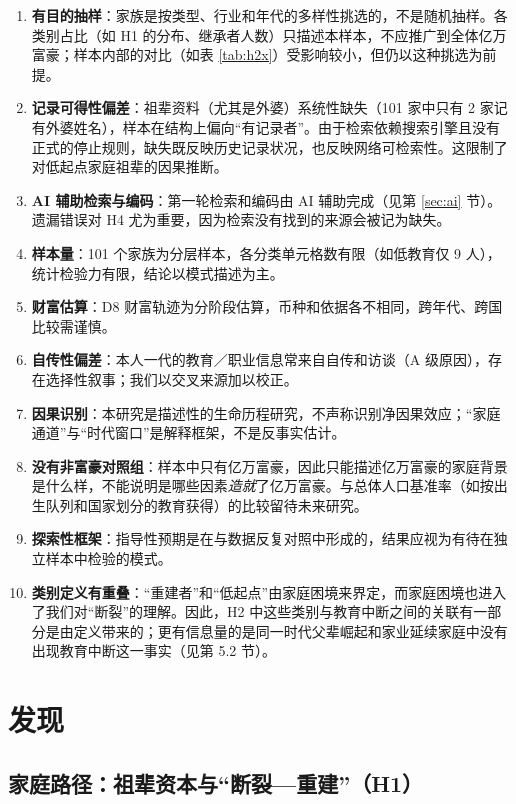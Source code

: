\documentclass[UTF8,a4paper,11pt]{ctexart}
\begin{document}
\begin{enumerate}
\item \textbf{有目的抽样}：家族是按类型、行业和年代的多样性挑选的，不是随机抽样。各类别占比（如 H1 的分布、继承者人数）只描述本样本，不应推广到全体亿万富豪；样本内部的对比（如表 \ref{tab:h2x}）受影响较小，但仍以这种挑选为前提。
\item \textbf{记录可得性偏差}：祖辈资料（尤其是外婆）系统性缺失（101 家中只有 2 家记有外婆姓名），样本在结构上偏向“有记录者”。由于检索依赖搜索引擎且没有正式的停止规则，缺失既反映历史记录状况，也反映网络可检索性。这限制了对低起点家庭祖辈的因果推断。
\item \textbf{AI 辅助检索与编码}：第一轮检索和编码由 AI 辅助完成（见第 \ref{sec:ai} 节）。遗漏错误对 H4 尤为重要，因为检索没有找到的来源会被记为缺失。
\item \textbf{样本量}：101 个家族为分层样本，各分类单元格数有限（如低教育仅 9 人），统计检验力有限，结论以模式描述为主。
\item \textbf{财富估算}：D8 财富轨迹为分阶段估算，币种和依据各不相同，跨年代、跨国比较需谨慎。
\item \textbf{自传性偏差}：本人一代的教育／职业信息常来自自传和访谈（A 级原因），存在选择性叙事；我们以交叉来源加以校正。
\item \textbf{因果识别}：本研究是描述性的生命历程研究，不声称识别净因果效应；“家庭通道”与“时代窗口”是解释框架，不是反事实估计。
\item \textbf{没有非富豪对照组}：样本中只有亿万富豪，因此只能描述亿万富豪的家庭背景是什么样，不能说明是哪些因素\emph{造就}了亿万富豪。与总体人口基准率（如按出生队列和国家划分的教育获得）的比较留待未来研究。
\item \textbf{探索性框架}：指导性预期是在与数据反复对照中形成的，结果应视为有待在独立样本中检验的模式。
\item \textbf{类别定义有重叠}：“重建者”和“低起点”由家庭困境来界定，而家庭困境也进入了我们对“断裂”的理解。因此，H2 中这些类别与教育中断之间的关联有一部分是由定义带来的；更有信息量的是同一时代父辈崛起和家业延续家庭中没有出现教育中断这一事实（见第 5.2 节）。
\end{enumerate}

\section{发现}
\label{sec:findings}

\subsection{家庭路径：祖辈资本与“断裂—重建”（H1）}
\end{document}
